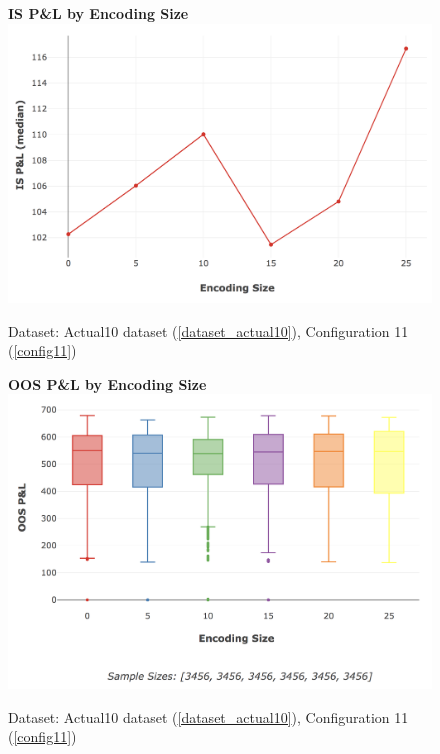 \documentclass[a4paper,11pt,oneside]{article}
\theoremstyle{plain}
\theoremstyle{definition}
\begin{document}
		
		\begin{figure}[H]
		\centering 
		\textbf{IS P\&L by Encoding Size}
		\includegraphics[scale=0.4]{images/results/primary/IS_Encoding_PL_median.png} 
		\caption[IS P\&L by Encoding Size]{Dataset: Actual10 dataset (\ref{dataset_actual10}), Configuration 11 (\ref{config11})
		\newline }
		\label{figure-IS Encoding_PL_median}
		\end{figure}	
		
		\begin{figure}[H]
		\centering 
		\textbf{OOS P\&L by Encoding Size}
		\includegraphics[scale=0.4]{images/results/primary/OOS_Encoding_PL_Box.png} 
		\caption[IS P\&L by Encoding Size]{Dataset: Actual10 dataset (\ref{dataset_actual10}), Configuration 11 (\ref{config11})
			\newline }
		\label{figure_OOS_Encoding_PL_Box}
		\end{figure}	
		
\end{document}
